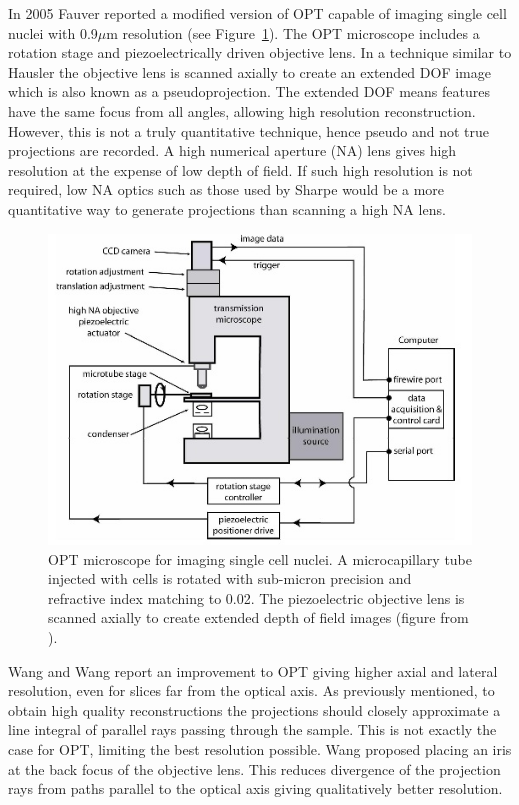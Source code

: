 \documentclass[12pt]{article}
\begin{document}
In 2005 Fauver reported a modified version of OPT capable of imaging single cell nuclei with 0.9$\mu$m resolution (see Figure~\ref{fig:fauver_setup}).\cite{Fauver:2005} The OPT microscope includes a rotation stage and  piezoelectrically driven objective lens. In a technique similar to Hausler \cite{hausler1972method} the objective lens is scanned axially to create an extended DOF image which is also known as a pseudoprojection. The extended DOF means features have the same focus from all angles, allowing high resolution reconstruction. However, this is not a truly quantitative technique, hence pseudo and not true projections are recorded. A high numerical aperture (NA) lens gives high resolution at the expense of low depth of field. If such high resolution is not required, low NA optics such as those used by Sharpe would be a more quantitative way to generate  projections than scanning a high NA lens.



\begin{figure}[H]
\centering
\includegraphics[scale=0.8]{Fauver_2005_setup.jpg}
\caption{OPT microscope for imaging single cell nuclei. A microcapillary tube injected with cells is rotated with sub-micron precision and refractive index matching  to 0.02. The piezoelectric objective lens is scanned axially to create extended depth of field images (figure from \cite{Fauver:2005}).}
\label{fig:fauver_setup}
\end{figure}


Wang and Wang report an improvement to OPT giving higher axial and lateral resolution, even for slices far from the optical axis. \cite{Wang:2006hy, Wang:2007} As previously mentioned, to obtain high quality reconstructions the projections should closely approximate a line integral of parallel rays passing through the sample. \cite{Wang:2006hy} This is not exactly the case for  OPT, limiting the best resolution possible. Wang proposed placing an iris at the back focus of the objective lens. This reduces divergence of the projection rays from paths parallel to the optical axis giving qualitatively better resolution.
\end{document}
